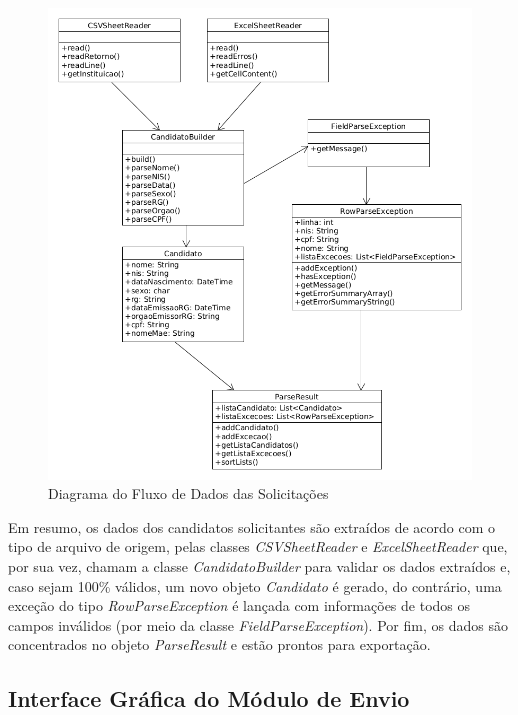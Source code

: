 \documentclass[
	12pt,			%
	openright,		%
	oneside,	
	a4paper,		%
	english,		%
	brazil			%
]{abntex2/abntex2}  %
\begin{document}
				\begin{figure}[h]
					\begin{center}
						
						\caption{Diagrama do Fluxo de Dados das Solicitações}
						\label{envio-uml}
						
						\includegraphics[scale=0.6]{img/envio-uml}
						
					\end{center}
				\end{figure}
	
				Em resumo, os dados dos candidatos solicitantes são extraídos de acordo com o tipo de arquivo de origem, pelas classes \textit{CSVSheetReader} e \textit{ExcelSheetReader} que, por sua vez, chamam a classe \textit{CandidatoBuilder} para validar os dados extraídos e, caso sejam 100\% válidos, um novo objeto \textit{Candidato} é gerado, do contrário, uma exceção do tipo \textit{RowParseException} é lançada com informações de todos os campos inválidos (por meio da classe \textit{FieldParseException}). Por fim, os dados são concentrados no objeto \textit{ParseResult} e estão prontos para exportação.
	
			\subsection{Interface Gráfica do Módulo de Envio}
	
\end{document}
